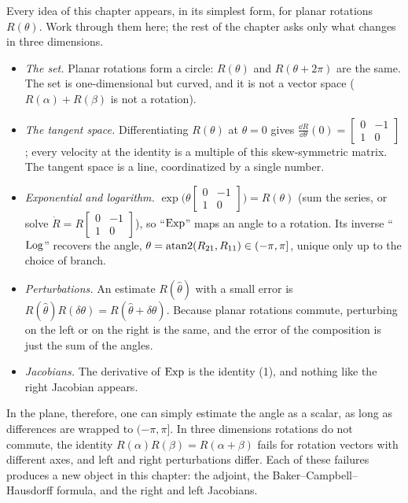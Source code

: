 Every idea of this chapter appears, in its simplest form, for planar rotations $R(\theta)$. Work through them here; the rest of the chapter
asks only what changes in three dimensions.
\begin{itemize}
  \item \emph{The set.} Planar rotations form a circle: $R(\theta)$ and $R(\theta + 2\pi)$ are the same. The set is one-dimensional but curved, and it is
        not a vector space ($R(\alpha) + R(\beta)$ is not a rotation).
  \item \emph{The tangent space.} Differentiating $R(\theta)$ at $\theta = 0$ gives $\frac{\dd R}{\dd\theta}(0) = \begin{bmatrix}0 & -1\\ 1 & 0\end{bmatrix}$; every velocity at the
        identity is a multiple of this skew-symmetric matrix. The tangent space is a line, coordinatized by a single number.
  \item \emph{Exponential and logarithm.} $\exp\big(\theta\begin{bmatrix}0 & -1\\ 1 & 0\end{bmatrix}\big) = R(\theta)$ (sum the series, or solve
        $\dot R = R\begin{bmatrix}0&-1\\1&0\end{bmatrix}$), so ``$\operatorname{Exp}$'' maps an angle to a rotation. Its inverse ``$\operatorname{Log}$'' recovers the angle,
        $\theta = \operatorname{atan2}(R_{21}, R_{11}) \in (-\pi, \pi]$, unique only up to the choice of branch.
  \item \emph{Perturbations.} An estimate $R(\hat\theta)$ with a small error is $R(\hat\theta)R(\delta\theta) = R(\hat\theta + \delta\theta)$. Because planar rotations commute,
        perturbing on the left or on the right is the same, and the error of the composition is just the sum of the angles.
  \item \emph{Jacobians.} The derivative of $\operatorname{Exp}$ is the identity (1), and nothing like the right Jacobian appears.
\end{itemize}
In the plane, therefore, one can simply estimate the angle as a scalar, as long as differences are wrapped to $(-\pi, \pi]$. In three dimensions
rotations do not commute, the identity $R(\alpha)R(\beta) = R(\alpha + \beta)$ fails for rotation vectors with different axes, and left and right
perturbations differ. Each of these failures produces a new object in this chapter: the adjoint, the Baker--Campbell--Hausdorff formula, and the
right and left Jacobians.

